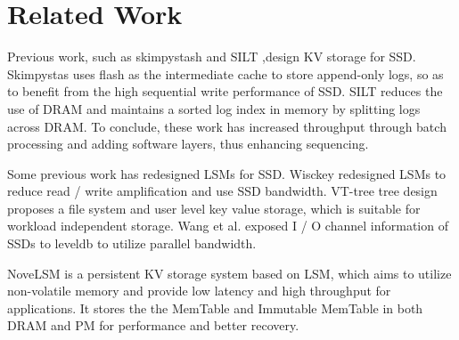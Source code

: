 \section{Related Work}

Previous work, such as skimpystash\cite{skimpystash} and SILT\cite{SILT} ,design KV storage for SSD. 
Skimpystas uses flash as the intermediate cache to store append-only logs, 
so as to benefit from the high sequential write performance of SSD. 
SILT reduces the use of DRAM and maintains a sorted log index in memory by splitting logs across DRAM.
To conclude, these work has increased throughput through batch processing and adding software layers, 
thus enhancing sequencing.

Some previous work has redesigned LSMs for SSD. Wisckey\cite{Wisckey} redesigned LSMs to reduce read / write amplification and use SSD bandwidth. 
VT-tree\cite{VT-tree} tree design proposes a file system and user level key value storage, which is suitable for workload independent storage. Wang et al.\cite{Wang} exposed I / O channel information of SSDs to leveldb to utilize parallel bandwidth.

NoveLSM\cite{NoveLSM} is a persistent KV storage system based on LSM, which aims to utilize non-volatile memory and provide low latency and high throughput for applications. 
It stores the the MemTable and Immutable MemTable in both DRAM and PM for performance and better recovery. 
